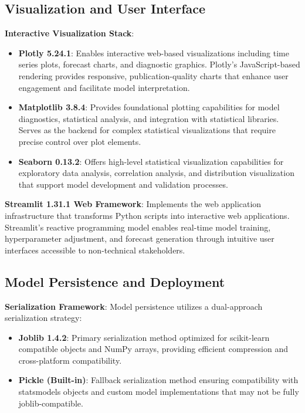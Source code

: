 \subsection{Visualization and User Interface}

\textbf{Interactive Visualization Stack}:
\begin{itemize}
\item \textbf{Plotly 5.24.1}: Enables interactive web-based visualizations including time series plots, forecast charts, and diagnostic graphics. Plotly's JavaScript-based rendering provides responsive, publication-quality charts that enhance user engagement and facilitate model interpretation.
\item \textbf{Matplotlib 3.8.4}: Provides foundational plotting capabilities for model diagnostics, statistical analysis, and integration with statistical libraries. Serves as the backend for complex statistical visualizations that require precise control over plot elements.
\item \textbf{Seaborn 0.13.2}: Offers high-level statistical visualization capabilities for exploratory data analysis, correlation analysis, and distribution visualization that support model development and validation processes.
\end{itemize}

\textbf{Streamlit 1.31.1 Web Framework}: Implements the web application infrastructure that transforms Python scripts into interactive web applications. Streamlit's reactive programming model enables real-time model training, hyperparameter adjustment, and forecast generation through intuitive user interfaces accessible to non-technical stakeholders.

\subsection{Model Persistence and Deployment}

\textbf{Serialization Framework}: Model persistence utilizes a dual-approach serialization strategy:
\begin{itemize}
\item \textbf{Joblib 1.4.2}: Primary serialization method optimized for scikit-learn compatible objects and NumPy arrays, providing efficient compression and cross-platform compatibility.
\item \textbf{Pickle (Built-in)}: Fallback serialization method ensuring compatibility with statsmodels objects and custom model implementations that may not be fully joblib-compatible.
\end{itemize}


